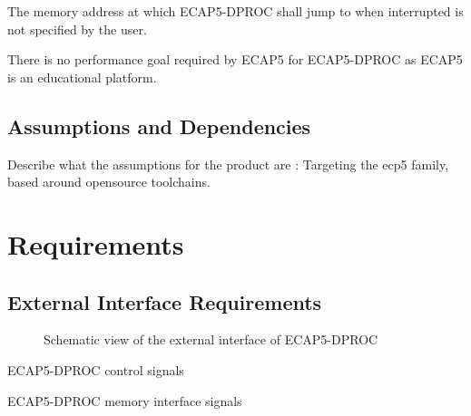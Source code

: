 

\begin{content}
The memory address at which ECAP5-DPROC shall jump to when interrupted is not specified by the user.
\end{content}


\begin{content}
There is no performance goal required by ECAP5 for ECAP5-DPROC as ECAP5 is an educational platform.
\end{content}

\subsection{Assumptions and Dependencies}

\begin{content}
Describe what the assumptions for the product are : Targeting the ecp5 family, based around opensource toolchains.
\end{content}

\section{Requirements}

\subsection{External Interface Requirements}

\begin{figure}[h!]
    \centering
    
    \caption{Schematic view of the external interface of ECAP5-DPROC}
    \label{fig:externalinterface}
\end{figure}

\begin{table}[H]
  \centering
  
  \caption{ECAP5-DPROC control signals}
  \label{tab:control-interface}
\end{table}

\begin{table}[H]
  \centering
  
  \caption{ECAP5-DPROC memory interface signals}
  \label{tab:memory-interface}
\end{table}

